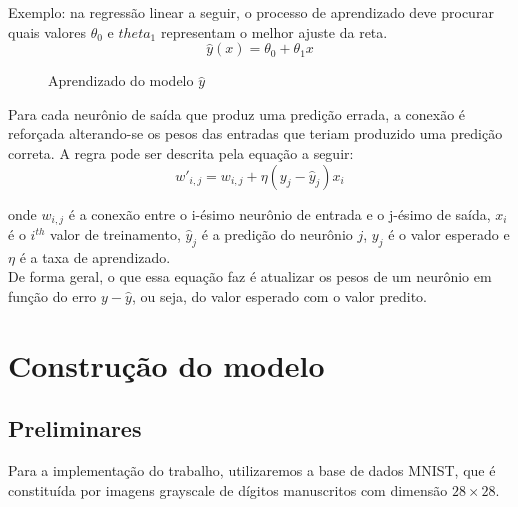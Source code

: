 Exemplo: na regressão linear a seguir, o processo de aprendizado deve procurar quais valores $\theta_0$ e $theta_1$ representam o melhor ajuste da reta. 
$$\hat{y}(x)= \theta_0 + \theta_1x$$ 

\begin{figure}[h!]
	\centering
	
	
	\caption{Aprendizado do modelo $\hat{y}$}
	\label{fig:aprendiadoreta}
\end{figure}

Para cada neurônio de saída que produz uma predição errada, a conexão é reforçada alterando-se os pesos das entradas que teriam produzido uma predição correta. A regra pode ser descrita pela equação a seguir: 
$$w'_{i,j} = w_{i,j} + \eta(y_j - \hat{y}_j)x_i$$

onde $w_{i,j}$ é a conexão entre o i-ésimo neurônio de entrada e o j-ésimo de saída, $x_i$ é o $i^{th}$ valor de treinamento, $\hat{y}_j$ é a predição do neurônio $j$, $y_j$ é o valor esperado e $\eta$ é a taxa de aprendizado.   \\


De forma geral, o que essa equação faz é atualizar os pesos de um neurônio em função do erro $y - \hat{y}$, ou seja, do valor esperado com o valor predito.  

\newpage

\section{Construção do modelo}
\subsection{Preliminares}
Para a implementação do trabalho, utilizaremos a base de dados MNIST, que é constituída por imagens grayscale de dígitos manuscritos com dimensão $28 \times 28$. 

